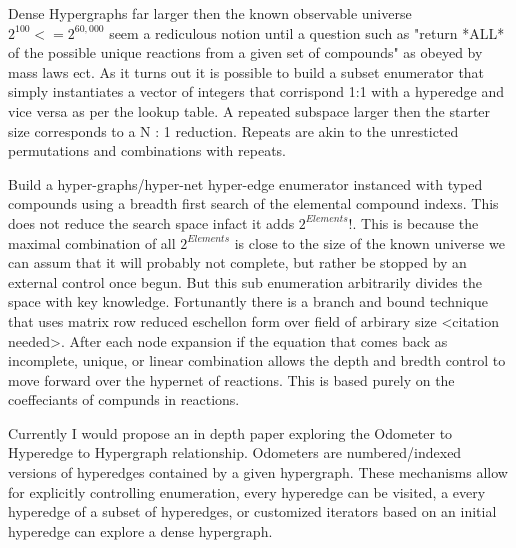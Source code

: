 \documentclass{article}
\begin{document}
Dense Hypergraphs far larger then the known observable universe $2^{100} <=2^{60,000}$ seem a rediculous notion until a question such as "return *ALL* of the possible unique reactions from a given set of compounds" as obeyed by mass laws ect. As it turns out it is possible to build a subset enumerator that simply instantiates a vector of integers that corrispond 1:1 with a hyperedge and vice versa as per the lookup table. A repeated subspace larger then the starter size corresponds to a N : 1 reduction. Repeats are akin to the unresticted permutations and combinations with repeats.

Build a hyper-graphs/hyper-net hyper-edge enumerator instanced with typed compounds using a breadth first search of the elemental compound indexs. This does not reduce the search space infact it adds $2^{Elements}$!. This is because the maximal combination of all $2^{Elements}$ is close to the size of the known universe we can assum that it will probably not complete, but rather be stopped by an external control once begun. But this sub enumeration arbitrarily divides the space with key knowledge. Fortunantly there is a branch and bound technique that uses matrix row reduced eschellon form over field of arbirary size <citation needed>. After each node expansion if the equation that comes back as incomplete, unique, or linear combination allows the depth and bredth control to move forward over the hypernet of reactions. This is based purely on the coeffeciants of compunds in reactions. 




Currently I would propose an in depth paper exploring the Odometer to Hyperedge to Hypergraph relationship. Odometers are numbered/indexed versions of hyperedges contained by a given hypergraph. These mechanisms allow for explicitly controlling enumeration, every hyperedge can be visited, a every hyperedge of a subset of hyperedges, or customized iterators based on an initial hyperedge can explore a dense hypergraph. 
\newpage


\end{document}
